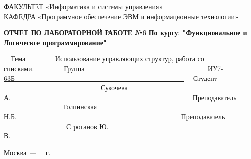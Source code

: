 \begin{titlepage}
{	{\doublespacing \small \raggedright ФАКУЛЬТЕТ \hspace{5mm} \underline{«Информатика и системы управления»}\\
	КАФЕДРА \hspace{10mm} \underline{«Программное обеспечение ЭВМ и информационные технологии»}\\}

	\vspace{20mm}

	\begin{center}
		\noindent\begin{minipage}{1.2\textwidth}\centering
			\textbf{ОТЧЕТ ПО ЛАБОРАТОРНОЙ РАБОТЕ №6}\newline
			\textbf{По курсу: "Функциональное и Логическое программирование"}\newline\newline\newline
		\end{minipage}
	\end{center}

	\vspace{20mm}

	\noindent ~~Тема \underline{~~~~~~~~Использование управляющих структур, работа со списками.~~~~~~}\newline
	\noindent ~~Группа \underline{~~~~~~~~~~~~~~~~~~~~~~~~~~~~~~~~~~~ИУ7-63Б~~~~~~~~~~~~~~~~~~~~~~~~~~~~~~~~~~~~~~~~~~~~~~~~~}\newline
	\noindent ~~Студент \underline{~~~~~~~~~~~~~~~~~~~~~~~~~~~~Сукочева А.~~~~~~~~~~~~~~~~~~~~~~~~~~~~~~~~~~~~~~~~~~~~~~~~~~}\newline
	\noindent ~~Преподаватель \underline{~~~~~~~~~~~~~~~~~Толпинская Н.Б.~~~~~~~~~~~~~~~~~~~~~~~~~~~~~~~~~~~~~~~~~~~~~}\newline
	\noindent ~~Преподаватель \underline{~~~~~~~~~~~~~~~~~~Строганов Ю. В.~~~~~~~~~~~~~~~~~~~~~~~~~~~~~~~~~~~~~~~~~~~~}\newline


	\begin{center}
		\vfill
		Москва~---~\the\year
		~г.
	\end{center}
	}



\end{titlepage}

\setcounter{page}{2}